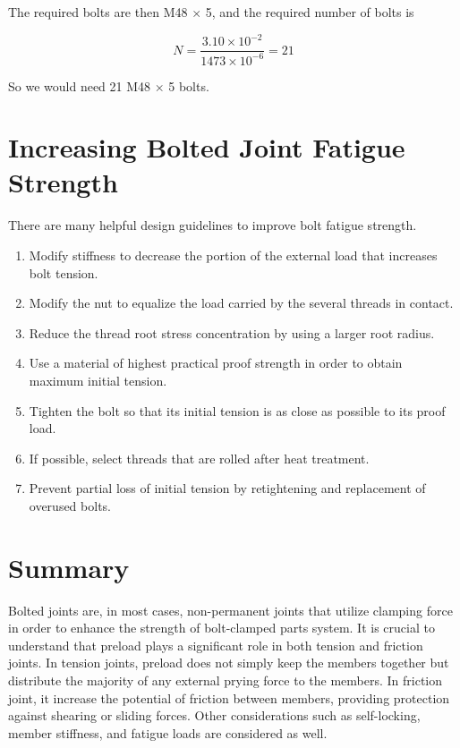 \documentclass[a4paper,openany,12pt]{book}
\begin{document}
{{The required bolts are then M48 \(\times\) 5, and the required number of
bolts is

$$N = \frac{3.10 \times 10^{-2}}{1473 \times 10^{-6}} = 21$$

So we would need 21 M48 \(\times\) 5 bolts.

\section{Increasing Bolted Joint Fatigue Strength}
\label{increasing-bolted-joint-fatigue-strength}
There are many helpful design guidelines to improve bolt fatigue
strength.

\begin{enumerate}
\item Modify stiffness to decrease the portion of the external load that
increases bolt tension.

\item Modify the nut to equalize the load carried by the several threads in
contact.

\item Reduce the thread root stress concentration by using a larger root
radius.

\item Use a material of highest practical proof strength in order to obtain
maximum initial tension.

\item Tighten the bolt so that its initial tension is as close as possible
to its proof load.

\item If possible, select threads that are rolled after heat treatment.

\item Prevent partial loss of initial tension by retightening and
replacement of overused bolts.
\end{enumerate}

\section{Summary}
\label{summary-7}
Bolted joints are, in most cases, non-permanent joints that utilize
clamping force in order to enhance the strength of bolt-clamped parts
system. It is crucial to understand that preload plays a significant
role in both tension and friction joints. In tension joints, preload
does not simply keep the members together but distribute the majority of
any external prying force to the members. In friction joint, it increase
the potential of friction between members, providing protection against
shearing or sliding forces. Other considerations such as self-locking,
member stiffness, and fatigue loads are considered as well.

}}
\end{document}
